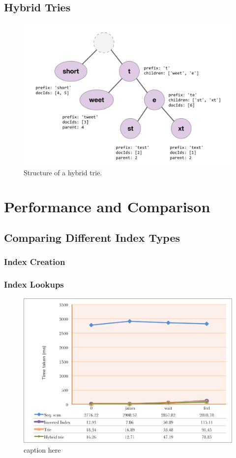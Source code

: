 \documentclass{vldb}
\begin{document}
\subsection{Hybrid Tries}

\begin{figure}[h!]
  \centering
   \includegraphics[scale=.4]{hybrid-trie}
  \caption{Structure of a hybrid trie.}
\end{figure}

\section{Performance and Comparison}

\subsection{Comparing Different Index Types}

\subsubsection{Index Creation}

\subsubsection{Index Lookups}


\begin{figure}[h!]
   \includegraphics[scale=.53]{query-times}
  \caption{caption here}
\end{figure}
\end{document}
